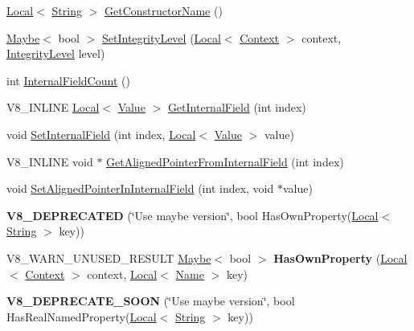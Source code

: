 \begin{DoxyCompactItemize}
\item 
\hyperlink{classv8_1_1Local}{Local}$<$ \hyperlink{classv8_1_1String}{String} $>$ \hyperlink{classv8_1_1Object_a7bbe987794658f20a3ec1b68326305e6}{Get\+Constructor\+Name} ()
\item 
\hyperlink{classv8_1_1Maybe}{Maybe}$<$ bool $>$ \hyperlink{classv8_1_1Object_ac45163422a18bb7481cc78fcacecb301}{Set\+Integrity\+Level} (\hyperlink{classv8_1_1Local}{Local}$<$ \hyperlink{classv8_1_1Context}{Context} $>$ context, \hyperlink{namespacev8_a02642d03ff1eecc2fd358626499c2e30}{Integrity\+Level} level)
\item 
int \hyperlink{classv8_1_1Object_aaec28576353eebe6fee113bce2718ecc}{Internal\+Field\+Count} ()
\item 
V8\+\_\+\+I\+N\+L\+I\+NE \hyperlink{classv8_1_1Local}{Local}$<$ \hyperlink{classv8_1_1Value}{Value} $>$ \hyperlink{classv8_1_1Object_aa3324fdf652d8ac3b2f27faa0559231d}{Get\+Internal\+Field} (int index)
\item 
void \hyperlink{classv8_1_1Object_aebf949a0592cebc144bb2f96bfb7ec72}{Set\+Internal\+Field} (int index, \hyperlink{classv8_1_1Local}{Local}$<$ \hyperlink{classv8_1_1Value}{Value} $>$ value)
\item 
V8\+\_\+\+I\+N\+L\+I\+NE void $\ast$ \hyperlink{classv8_1_1Object_a435f68bb7ef0f64dd522c5c910682448}{Get\+Aligned\+Pointer\+From\+Internal\+Field} (int index)
\item 
void \hyperlink{classv8_1_1Object_a0ccba69581f0b5e4e672bab90f26879b}{Set\+Aligned\+Pointer\+In\+Internal\+Field} (int index, void $\ast$value)
\item 
{\bfseries V8\+\_\+\+D\+E\+P\+R\+E\+C\+A\+T\+ED} (\char`\"{}Use maybe version\char`\"{}, bool Has\+Own\+Property(\hyperlink{classv8_1_1Local}{Local}$<$ \hyperlink{classv8_1_1String}{String} $>$ key))\hypertarget{classv8_1_1Object_a332143937efdc58dac2d877ebeb5f8ef}{}\label{classv8_1_1Object_a332143937efdc58dac2d877ebeb5f8ef}

\item 
V8\+\_\+\+W\+A\+R\+N\+\_\+\+U\+N\+U\+S\+E\+D\+\_\+\+R\+E\+S\+U\+LT \hyperlink{classv8_1_1Maybe}{Maybe}$<$ bool $>$ {\bfseries Has\+Own\+Property} (\hyperlink{classv8_1_1Local}{Local}$<$ \hyperlink{classv8_1_1Context}{Context} $>$ context, \hyperlink{classv8_1_1Local}{Local}$<$ \hyperlink{classv8_1_1Name}{Name} $>$ key)\hypertarget{classv8_1_1Object_acdd3921e95d5bb1a27cea489792607ff}{}\label{classv8_1_1Object_acdd3921e95d5bb1a27cea489792607ff}

\item 
{\bfseries V8\+\_\+\+D\+E\+P\+R\+E\+C\+A\+T\+E\+\_\+\+S\+O\+ON} (\char`\"{}Use maybe version\char`\"{}, bool Has\+Real\+Named\+Property(\hyperlink{classv8_1_1Local}{Local}$<$ \hyperlink{classv8_1_1String}{String} $>$ key))\hypertarget{classv8_1_1Object_abf24b52a108c801a74718e1a1e64ba5b}{}\label{classv8_1_1Object_abf24b52a108c801a74718e1a1e64ba5b}


\end{DoxyCompactItemize}
